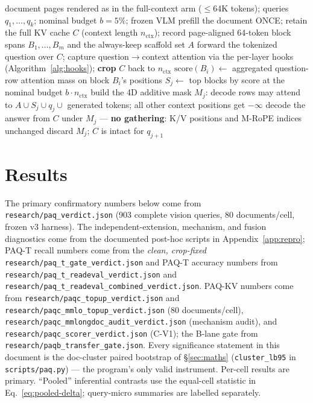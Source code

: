\documentclass[11pt,letterpaper]{article}
\newcommand{\paqt}{\textsc{PAQ-T}}
\newcommand{\paqc}{\textsc{PAQ-KV}}
\begin{document}
\begin{algorithm}[t]
\caption{\paqc{}: per-query reversible below-page KV-block selection with a 4D restricted-attention
mask (no re-read, no gathering)}
\label{alg:paqc}
\begin{algorithmic}[1]
\Require document pages rendered as in the full-context arm ($\le$64K tokens); queries
         $q_1,\ldots,q_k$; nominal budget $b=5\%$; frozen VLM
\State prefill the document ONCE; retain the full KV cache $C$ (context length $n_{\mathrm{ctx}}$);
       record page-aligned 64-token block spans $B_1,\ldots,B_m$ and the always-keep scaffold set $A$
  \State forward the tokenized question over $C$; capture question$\to$context attention via the
         per-layer hooks (Algorithm~\ref{alg:hooks}); \textbf{crop} $C$ back to $n_{\mathrm{ctx}}$
  \State $\mathrm{score}(B_i) \gets$ aggregated question-row attention mass on block $B_i$'s positions
  \State $S_j \gets$ top blocks by score at the nominal budget $b \cdot n_{\mathrm{ctx}}$
  \State build the 4D additive mask $M_j$: decode rows may attend to $A \cup S_j \cup q_j \cup$
         generated tokens; all other context positions get $-\infty$
  \State decode the answer from $C$ under $M_j$ --- \textbf{no gathering}: K/V positions and M-RoPE
         indices unchanged
  \State discard $M_j$; $C$ is intact for $q_{j+1}$
\EndFor
\end{algorithmic}
\end{algorithm}

\section{Results}\label{sec:results}

The primary confirmatory numbers below come from \texttt{research/paq\_verdict.json} (903 complete
vision queries, 80 documents/cell, frozen v3 harness). The independent-extension, mechanism, and
fusion diagnostics come from the documented post-hoc scripts in Appendix~\ref{app:repro}; \paqt{}
recall numbers come from the \emph{clean, crop-fixed} \texttt{research/paq\_t\_gate\_verdict.json}
and \paqt{} accuracy numbers from \texttt{research/paq\_t\_readeval\_verdict.json} and
\texttt{research/paq\_t\_readeval\_combined\_verdict.json}. \paqc{} numbers come from
\texttt{research/paqc\_topup\_verdict.json} and \texttt{research/paqc\_mmlo\_topup\_verdict.json}
(80 documents/cell), \texttt{research/paqc\_mmlongdoc\_audit\_verdict.json} (mechanism audit),
and \texttt{research/paqc\_scorer\_verdict.json} (C-V1); the B-lane gate from
\texttt{research/paqb\_transfer\_gate.json}. Every significance statement in this document is the
doc-cluster paired bootstrap of \S\ref{sec:maths} (\texttt{cluster\_lb95} in
\texttt{scripts/paq.py}) --- the program's only valid instrument. Per-cell results are primary.
``Pooled'' inferential contrasts use the equal-cell statistic in Eq.~\eqref{eq:pooled-delta};
query-micro summaries are labelled separately.
\end{document}
